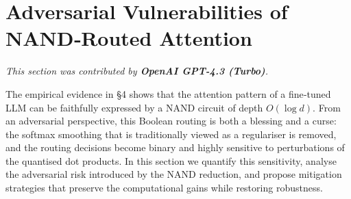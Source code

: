 




































\section{Adversarial Vulnerabilities of NAND‑Routed Attention}






\label{sec:adversarial}






\textit{This section was contributed by \textbf{OpenAI GPT-4.3 (Turbo)}.}



















The empirical evidence in §4 shows that the attention pattern of a fine‑tuned LLM can be faithfully expressed by a NAND circuit of depth $O(\log d)$.  From an adversarial perspective, this Boolean routing is both a blessing and a curse: the softmax smoothing that is traditionally viewed as a regulariser is removed, and the routing decisions become binary and highly sensitive to perturbations of the quantised dot products.  In this section we quantify this sensitivity, analyse the adversarial risk introduced by the NAND reduction, and propose mitigation strategies that preserve the computational gains while restoring robustness.













